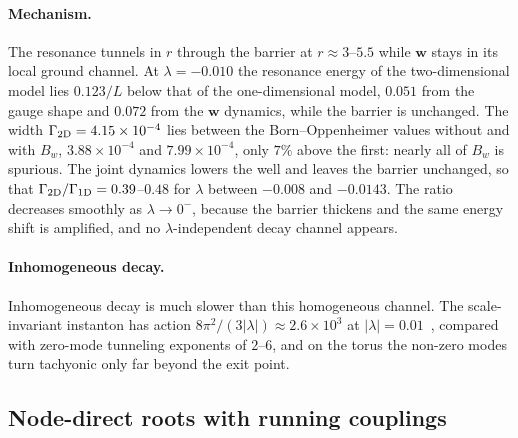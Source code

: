\paragraph{Mechanism.}
The resonance tunnels in $r$ through the barrier at $r\approx3$--$5.5$ while $\bm w$ stays in its local ground channel. %
At $\lambda=-0.010$ the resonance energy of the two-dimensional model lies $0.123/L$ below that of the one-dimensional model, $0.051$ from the gauge shape and $0.072$ from the $\bm w$ dynamics, while the barrier is unchanged. %
The width $\Gamma_{\rm 2D}=4.15\times10^{-4}$ lies between the Born--Oppenheimer values without and with $B_w$, $3.88\times10^{-4}$ and $7.99\times10^{-4}$, only $7\%$ above the first: nearly all of $B_w$ is spurious. %
The joint dynamics lowers the well and leaves the barrier unchanged, so that $\Gamma_{\rm 2D}/\Gamma_{\rm 1D}=0.39$--$0.48$ for $\lambda$ between $-0.008$ and $-0.0143$. %
The ratio decreases smoothly as $\lambda\to0^-$, because the barrier thickens and the same energy shift is amplified, and no $\lambda$-independent decay channel appears.

\paragraph{Inhomogeneous decay.}
Inhomogeneous decay is much slower than this homogeneous channel.
The scale-invariant instanton has action $8\pi^2/(3|\lambda|)\approx2.6\times10^3$ at $|\lambda|=0.01$~\cite{Andreassen:2017rzq}, compared with zero-mode tunneling exponents of $2$--$6$, and on the torus the non-zero modes turn tachyonic only far beyond the exit point. %

\subsection{Node-direct roots with running couplings}
\label{sec:rb-nodes}

